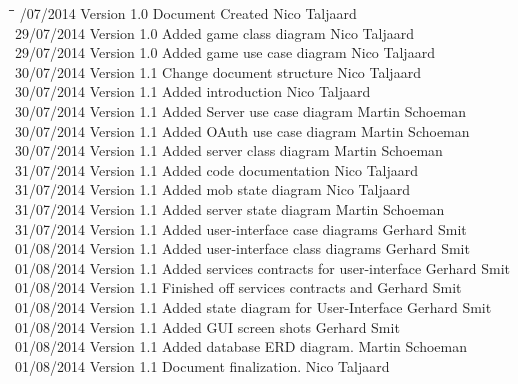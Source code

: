 \documentclass[letterpaper]{article}
\begin{document}
		\begin{tabbing}
			\hspace*{2.5cm}\=\hspace*{2.5cm}\=\hspace*{8cm}\=\hspace*{3cm} /07/2014	\> Version 1.0	\> Document Created 							\> Nico Taljaard \\
			29/07/2014	\> Version 1.0	\> Added game class diagram						\> Nico Taljaard \\
			29/07/2014	\> Version 1.0	\> Added game use case diagram					\> Nico Taljaard \\
			30/07/2014	\> Version 1.1	\> Change document structure					\> Nico Taljaard \\
			30/07/2014	\> Version 1.1	\> Added introduction							\> Nico Taljaard \\
			30/07/2014  \> Version 1.1  \> Added Server use case diagram				\> Martin Schoeman\\
			30/07/2014  \> Version 1.1  \> Added OAuth use case diagram					\> Martin Schoeman\\
			30/07/2014  \> Version 1.1  \> Added server class diagram					\> Martin Schoeman\\
			31/07/2014  \> Version 1.1  \> Added code documentation						\> Nico Taljaard\\
			31/07/2014  \> Version 1.1  \> Added mob state diagram						\> Nico Taljaard\\
			31/07/2014  \> Version 1.1  \> Added server state diagram					\> Martin Schoeman\\
			31/07/2014  \> Version 1.1  \> Added user-interface case diagrams			\> Gerhard Smit\\
			01/08/2014  \> Version 1.1  \> Added user-interface class diagrams			\> Gerhard Smit\\
			01/08/2014  \> Version 1.1  \> Added services contracts for user-interface 	\> Gerhard Smit\\
			01/08/2014  \> Version 1.1  \> Finished off services contracts and 			\> Gerhard Smit\\
			01/08/2014	\> Version 1.1	\> Added state diagram for User-Interface 		\> Gerhard Smit\\
			01/08/2014  \> Version 1.1  \> Added GUI screen shots						\> Gerhard Smit\\
			01/08/2014  \> Version 1.1  \> Added database ERD diagram.					\> Martin Schoeman\\
			01/08/2014  \> Version 1.1  \> Document finalization.						\> Nico Taljaard\\

\end{tabbing}
\end{document}
